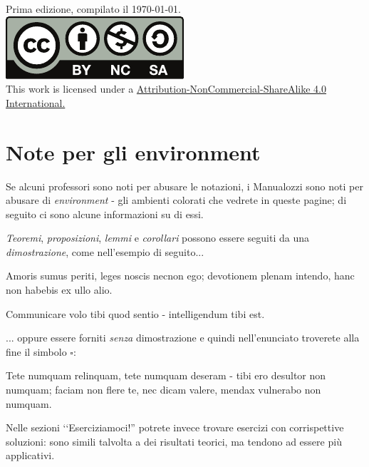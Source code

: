 \vfill
\begin{center}
	Prima edizione, compilato il \today.\\
			\includegraphics[trim=0cm 0cm 0cm 0cm,clip,scale=0.5]{images/Cc-by-nc-sa_icon.pdf}\\
	{\footnotesize This work is licensed under a \href{https://creativecommons.org/licenses/by-sa/4.0/}{Attribution-NonCommercial-ShareAlike 4.0 International.}}
\end{center}
\newpage
\section*{Note per gli environment}
Se alcuni professori sono noti per abusare le notazioni, i Manualozzi sono noti per abusare di \textit{environment} - gli ambienti colorati che vedrete in queste pagine; di seguito ci sono alcune informazioni su di essi.

\noindent\textit{Teoremi}, \textit{proposizioni}, \textit{lemmi} e \textit{corollari} possono essere seguiti da una \textit{dimostrazione}, come nell'esempio di seguito...
\begin{theoremanote}
	Amoris sumus periti, leges noscis necnon ego; devotionem plenam intendo, hanc non habebis ex ullo alio.
\end{theoremanote}
\begin{demonstration}
	Communicare volo tibi quod sentio - intelligendum tibi est.
\end{demonstration}
... oppure essere forniti \textit{senza} dimostrazione e quindi nell'enunciato troverete alla fine il simbolo $\square$:
\begin{corollarynote}[Ricardovolvere]
	Tete numquam relinquam, tete numquam deseram - tibi ero desultor non numquam; faciam non flere te, nec dicam valere,
	mendax vulnerabo non numquam.
\end{corollarynote}
Nelle sezioni ‘‘Eserciziamoci!'' potrete invece trovare esercizi con corrispettive soluzioni: sono simili talvolta a dei risultati teorici, ma tendono ad essere più applicativi.

